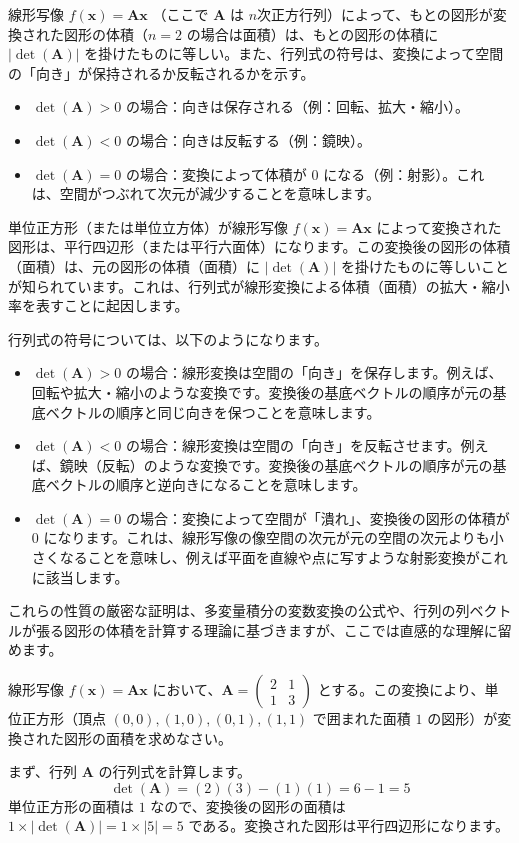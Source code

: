 \begin{thm}[行列式の幾何学的意味] \label{geometric_determinant}
線形写像 $f(\bm{x}) = \bm{A}\bm{x}$ （ここで $\bm{A}$ は $n$次正方行列）によって、もとの図形が変換された図形の体積（$n=2$ の場合は面積）は、もとの図形の体積に $|\det(\bm{A})|$ を掛けたものに等しい。また、行列式の符号は、変換によって空間の「向き」が保持されるか反転されるかを示す。
\begin{itemize}
    \item $\det(\bm{A}) > 0$ の場合：向きは保存される（例：回転、拡大・縮小）。
    \item $\det(\bm{A}) < 0$ の場合：向きは反転する（例：鏡映）。
    \item $\det(\bm{A}) = 0$ の場合：変換によって体積が $0$ になる（例：射影）。これは、空間がつぶれて次元が減少することを意味します。
\end{itemize}
\begin{proof*}
単位正方形（または単位立方体）が線形写像 $f(\bm{x}) = \bm{A}\bm{x}$ によって変換された図形は、平行四辺形（または平行六面体）になります。この変換後の図形の体積（面積）は、元の図形の体積（面積）に $|\det(\bm{A})|$ を掛けたものに等しいことが知られています。これは、行列式が線形変換による体積（面積）の拡大・縮小率を表すことに起因します。\par
行列式の符号については、以下のようになります。
\begin{itemize}
    \item $\det(\bm{A}) > 0$ の場合：線形変換は空間の「向き」を保存します。例えば、回転や拡大・縮小のような変換です。変換後の基底ベクトルの順序が元の基底ベクトルの順序と同じ向きを保つことを意味します。
    \item $\det(\bm{A}) < 0$ の場合：線形変換は空間の「向き」を反転させます。例えば、鏡映（反転）のような変換です。変換後の基底ベクトルの順序が元の基底ベクトルの順序と逆向きになることを意味します。
    \item $\det(\bm{A}) = 0$ の場合：変換によって空間が「潰れ」、変換後の図形の体積が $0$ になります。これは、線形写像の像空間の次元が元の空間の次元よりも小さくなることを意味し、例えば平面を直線や点に写すような射影変換がこれに該当します。
\end{itemize}
これらの性質の厳密な証明は、多変量積分の変数変換の公式や、行列の列ベクトルが張る図形の体積を計算する理論に基づきますが、ここでは直感的な理解に留めます。
\end{proof*}
\end{thm}

\begin{ex}
線形写像 $f(\bm{x}) = \bm{A}\bm{x}$ において、$\bm{A} = \begin{pmatrix} 2 & 1 \\ 1 & 3 \end{pmatrix}$ とする。この変換により、単位正方形（頂点 $(0,0), (1,0), (0,1), (1,1)$ で囲まれた面積 $1$ の図形）が変換された図形の面積を求めなさい。\par
まず、行列 $\bm{A}$ の行列式を計算します。
\[ \det(\bm{A}) = (2)(3) - (1)(1) = 6 - 1 = 5 \]
単位正方形の面積は $1$ なので、変換後の図形の面積は $1 \times |\det(\bm{A})| = 1 \times |5| = 5$ である。変換された図形は平行四辺形になります。
\end{ex}

